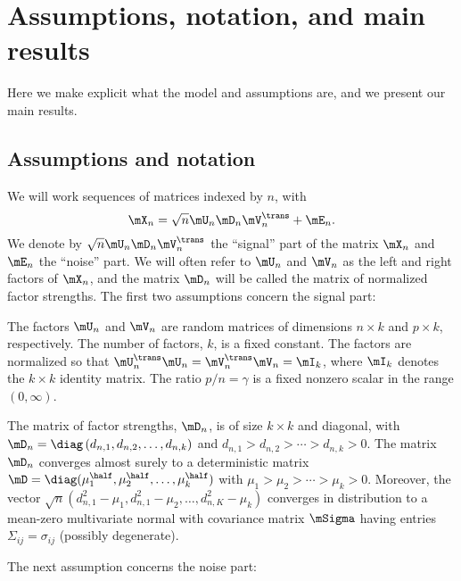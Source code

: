\section{Assumptions, notation, and main results}

Here we make explicit what the model and assumptions are, and we present our
main results.

\subsection{Assumptions and notation}

We will work sequences of matrices indexed by $n$, with
\[
    \mX_n = \sqrt{n} \mU_n \mD_n \mV_n^\trans + \mE_n.
\]
We denote by $\sqrt{n} \mU_n \mD_n \mV_n^\trans$ the ``signal'' part of the
matrix $\mX_n$ and $\mE_n$ the ``noise'' part. We will often refer to $\mU_n$
and $\mV_n$ as the left and right factors of $\mX_n$, and the matrix $\mD_n$
will be called the matrix of normalized factor strengths. The first two
assumptions concern the signal part:

\begin{assumption}\label{A:factors}
    The factors $\mU_n$ and $\mV_n$ are random matrices of dimensions
    $n \times k$ and $p \times k$, respectively.  The number of factors, $k$,
    is a fixed constant.  The factors are normalized so that
    $\mU_n^\trans \mU_n =  \mV_n^\trans \mV_n = \mI_k$, where $\mI_k$ denotes 
    the $k \times k$ identity matrix.  The ratio $p/n = \gamma$ is a fixed 
    nonzero scalar in the range $(0,\infty)$.
\end{assumption}
\noindent

\begin{assumption}\label{A:sizes}
    The matrix of factor strengths, $\mD_n$, is of size $k\times k$ and 
    diagonal, with 
    \(
        \mD_n = \diag \left( d_{n,1}, d_{n,2}, \ldots, d_{n,k} \right)
    \)
    and
    $d_{n,1} > d_{n,2} > \cdots > d_{n,k} > 0$.  The matrix $\mD_n$ converges
    almost surely to a deterministic matrix 
    $\mD = \diag( \mu_1^\half, \mu_2^\half, \ldots, \mu_k^\half)$ with
    $\mu_1 > \mu_2 > \cdots > \mu_k > 0$. Moreover, the vector
    \(
        \sqrt{n} ( d_{n,1}^2 - \mu_1, d_{n,1}^2 - \mu_2, 
                   \ldots, 
                   d_{n,K}^2 - \mu_k )
    \)
    converges in distribution to a mean-zero multivariate normal with 
    covariance matrix $\mSigma$ having entries $\Sigma_{ij} = \sigma_{ij}$
    (possibly degenerate).
\end{assumption}
\noindent
The next assumption concerns the noise part:

